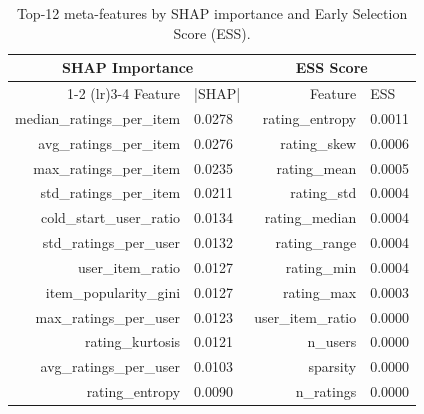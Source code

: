 \begin{table}[t]
\centering
\caption{Top-12 meta-features by SHAP importance and Early Selection Score (ESS).}
\label{tab:rq2}
\small
\begin{tabular}{rlrl}
\toprule
\multicolumn{2}{c}{SHAP Importance} & \multicolumn{2}{c}{ESS Score} \\
\cmidrule(lr){1-2} \cmidrule(lr){3-4}
Feature & |SHAP| & Feature & ESS \\
\midrule
median\_ratings\_per\_item & 0.0278 & rating\_entropy & 0.0011 \\
avg\_ratings\_per\_item & 0.0276 & rating\_skew & 0.0006 \\
max\_ratings\_per\_item & 0.0235 & rating\_mean & 0.0005 \\
std\_ratings\_per\_item & 0.0211 & rating\_std & 0.0004 \\
cold\_start\_user\_ratio & 0.0134 & rating\_median & 0.0004 \\
std\_ratings\_per\_user & 0.0132 & rating\_range & 0.0004 \\
user\_item\_ratio & 0.0127 & rating\_min & 0.0004 \\
item\_popularity\_gini & 0.0127 & rating\_max & 0.0003 \\
max\_ratings\_per\_user & 0.0123 & user\_item\_ratio & 0.0000 \\
rating\_kurtosis & 0.0121 & n\_users & 0.0000 \\
avg\_ratings\_per\_user & 0.0103 & sparsity & 0.0000 \\
rating\_entropy & 0.0090 & n\_ratings & 0.0000 \\
\bottomrule
\end{tabular}
\end{table}